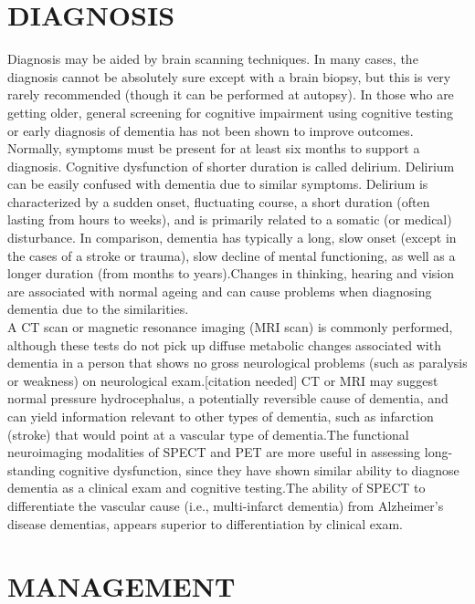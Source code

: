 \section{DIAGNOSIS}

Diagnosis may be aided by brain scanning techniques. In many cases, the diagnosis cannot be absolutely sure except with a brain biopsy, but this is very rarely recommended (though it can be performed at autopsy). In those who are getting older, general screening for cognitive impairment using cognitive testing or early diagnosis of dementia has not been shown to improve outcomes.\\
Normally, symptoms must be present for at least six months to support a diagnosis. Cognitive dysfunction of shorter duration is called delirium. Delirium can be easily confused with dementia due to similar symptoms. Delirium is characterized by a sudden onset, fluctuating course, a short duration (often lasting from hours to weeks), and is primarily related to a somatic (or medical) disturbance. In comparison, dementia has typically a long, slow onset (except in the cases of a stroke or trauma), slow decline of mental functioning, as well as a longer duration (from months to years).Changes in thinking, hearing and vision are associated with normal ageing and can cause problems when diagnosing dementia due to the similarities.\\A CT scan or magnetic resonance imaging (MRI scan) is commonly performed, although these tests do not pick up diffuse metabolic changes associated with dementia in a person that shows no gross neurological problems (such as paralysis or weakness) on neurological exam.[citation needed] CT or MRI may suggest normal pressure hydrocephalus, a potentially reversible cause of dementia, and can yield information relevant to other types of dementia, such as infarction (stroke) that would point at a vascular type of dementia.The functional neuroimaging modalities of SPECT and PET are more useful in assessing long-standing cognitive dysfunction, since they have shown similar ability to diagnose dementia as a clinical exam and cognitive testing.The ability of SPECT to differentiate the vascular cause (i.e., multi-infarct dementia) from Alzheimer's disease dementias, appears superior to differentiation by clinical exam.





\section{ MANAGEMENT}

